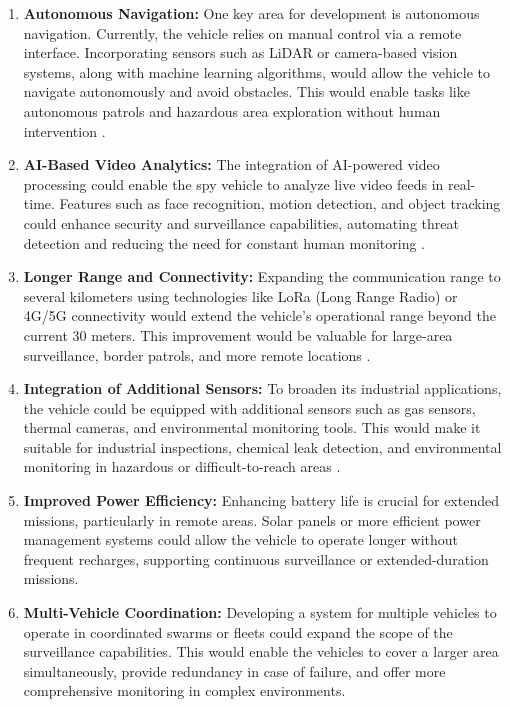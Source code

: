 \documentclass[12pt,a4paper]{report}
\begin{document}
\begin{enumerate}
    \item \textbf{Autonomous Navigation:} 
    One key area for development is autonomous navigation. Currently, the vehicle relies on manual control via a remote interface. Incorporating sensors such as LiDAR or camera-based vision systems, along with machine learning algorithms, would allow the vehicle to navigate autonomously and avoid obstacles. This would enable tasks like autonomous patrols and hazardous area exploration without human intervention \cite{anymal}.
    
    \item \textbf{AI-Based Video Analytics:} 
    The integration of AI-powered video processing could enable the spy vehicle to analyze live video feeds in real-time. Features such as face recognition, motion detection, and object tracking could enhance security and surveillance capabilities, automating threat detection and reducing the need for constant human monitoring \cite{homl}.
    
    \item \textbf{Longer Range and Connectivity:} 
    Expanding the communication range to several kilometers using technologies like LoRa (Long Range Radio) or 4G/5G connectivity would extend the vehicle's operational range beyond the current 30 meters. This improvement would be valuable for large-area surveillance, border patrols, and more remote locations \cite{iot}.
    
    \item \textbf{Integration of Additional Sensors:} 
    To broaden its industrial applications, the vehicle could be equipped with additional sensors such as gas sensors, thermal cameras, and environmental monitoring tools. This would make it suitable for industrial inspections, chemical leak detection, and environmental monitoring in hazardous or difficult-to-reach areas \cite{3dprinting}.
    
    \item \textbf{Improved Power Efficiency:} 
    Enhancing battery life is crucial for extended missions, particularly in remote areas. Solar panels or more efficient power management systems could allow the vehicle to operate longer without frequent recharges, supporting continuous surveillance or extended-duration missions.
    
    
\item \textbf{Multi-Vehicle Coordination:} 
Developing a system for multiple vehicles to operate in coordinated swarms or fleets could expand the scope of the surveillance capabilities. This would enable the vehicles to cover a larger area simultaneously, provide redundancy in case of failure, and offer more comprehensive monitoring in complex environments. 


\end{enumerate}
\end{document}
